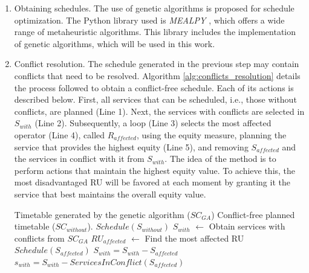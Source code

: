 \documentclass[preprint,12pt]{elsarticle}
\begin{document}
\begin{enumerate}


    \item Obtaining schedules. The use of genetic algorithms is proposed \cite{Holland1992} for schedule optimization. The Python library used is \textit{MEALPY} \cite{Vanthieu2023}, which offers a wide range of metaheuristic algorithms. This library includes the implementation of genetic algorithms, which will be used in this work.  
    \item Conflict resolution. The schedule generated in the previous step may contain conflicts that need to be resolved. Algorithm \ref{alg:conflicts_resolution} details the process followed to obtain a conflict-free schedule. Each of its actions is described below. First, all services that can be scheduled, i.e., those without conflicts, are planned (Line 1). Next, the services with conflicts are selected in $S_{with}$ (Line 2). Subsequently, a loop (Line 3) selects the most affected operator (Line 4), called $R_{affected}$, using the equity measure, planning the service that provides the highest equity (Line 5), and removing $S_{affected}$ and the services in conflict with it from $S_{with}$. The idea of the method is to perform actions that maintain the highest equity value. To achieve this, the most disadvantaged RU will be favored at each moment by granting it the service that best maintains the overall equity value.

\begin{algorithm}[!t]
\caption{Resolution of scheduling conflicts returned by the genetic algorithm.}
\label{alg:conflicts_resolution}
\begin{algorithmic}[1]
\REQUIRE Timetable generated by the genetic algorithm ($SC_{GA}$)
\ENSURE Conflict-free planned timetable ($SC_{without}$).
\STATE $Schedule(S_{without})$ 
\STATE $S_{with}$ $\leftarrow$ Obtain services with conflicts from $SC_{GA}$
    \STATE $RU_{affected}$ $\leftarrow$ Find the most affected RU
    \STATE $Schedule(S_{affected})$ 
    \STATE $S_{with} = S_{with} - S_{affected}$ 
    \STATE $s_{with} = S_{with} - ServicesInConflict(S_{affected})$ 
\ENDWHILE
\end{algorithmic}
\end{algorithm}


\end{enumerate}
\end{document}
